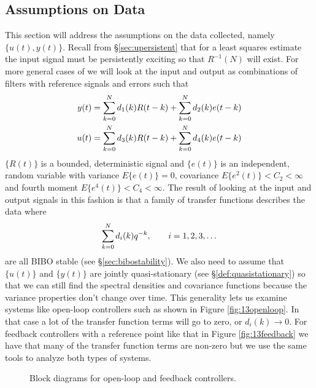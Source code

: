 \subsection{Assumptions on Data}
\label{sec:14data}
This section will address the assumptions on the data collected, namely $\{u(t),y(t)\}$. Recall from \S\ref{sec:upersistent} that for a least squares estimate the input signal must be persistently exciting so that $R^{-1}(N)$ will exist. For more general cases of we will look at the input and output as combinations of filters with reference signals and errors such that
\begin{align*}
y(t) &= \sum_{k=0}^N d_1(k)R(t-k) + \sum_{k=0}^N d_2(k)e(t-k) \\
u(t) &= \sum_{k=0}^N d_3(k)R(t-k) + \sum_{k=0}^N d_4(k)e(t-k)
\end{align*}
$\{R(t)\}$ is a bounded, deterministic signal and $\{e(t)\}$ is an independent, random variable with variance $E\{e(t)\} = 0$, covariance $E\{e^2(t)\}<C_2<\infty$ and fourth moment $E\{e^4(t)\}<C_4<\infty$. The result of looking at the input and output signals in this fashion is that a family of transfer functions describes the data where
$$\sum_{k=0}^N d_i(k)q^{-k}, \qquad i=1,2,3,\ldots$$
are all BIBO stable (see \S\ref{sec:bibostability}). We also need to assume that $\{u(t)\}$ and $\{y(t)\}$ are jointly quasi-stationary (see \S\ref{def:quasistationary}) so that we can still find the spectral densities and covariance functions because the variance properties don't change over time. This generality lets us examine systems like open-loop controllers such as shown in Figure \ref{fig:13openloop}. In that case a lot of the transfer function terms will go to zero, or $d_i(k)\to0$. For feedback controllers with a reference point like that in Figure \ref{fig:13feedback} we have that many of the transfer function terms are non-zero but we use the same tools to analyze both types of systems.

\begin{figure}[ht!]
  \centering
   \hfill
   \hfill
  \caption{Block diagrams for open-loop and feedback controllers.}
  \label{fig:13blocks}
\end{figure}

